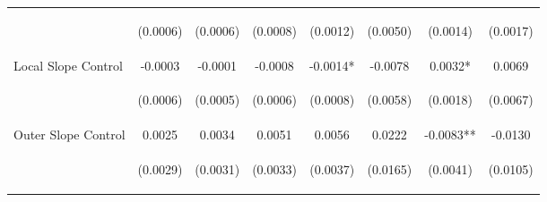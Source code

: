 \begin{tabular}{lccccccc}
\vspace{4pt} & \begin{footnotesize}(0.0006)\end{footnotesize} & \begin{footnotesize}(0.0006)\end{footnotesize} & \begin{footnotesize}(0.0008)\end{footnotesize} & \begin{footnotesize}(0.0012)\end{footnotesize} & \begin{footnotesize}(0.0050)\end{footnotesize} & \begin{footnotesize}(0.0014)\end{footnotesize} & \begin{footnotesize}(0.0017)\end{footnotesize} \\
Local Slope Control & -0.0003 & -0.0001 & -0.0008 & -0.0014* & -0.0078 & 0.0032* & 0.0069 \\
\vspace{4pt} & \begin{footnotesize}(0.0006)\end{footnotesize} & \begin{footnotesize}(0.0005)\end{footnotesize} & \begin{footnotesize}(0.0006)\end{footnotesize} & \begin{footnotesize}(0.0008)\end{footnotesize} & \begin{footnotesize}(0.0058)\end{footnotesize} & \begin{footnotesize}(0.0018)\end{footnotesize} & \begin{footnotesize}(0.0067)\end{footnotesize} \\
Outer Slope Control & 0.0025 & 0.0034 & 0.0051 & 0.0056 & 0.0222 & -0.0083** & -0.0130 \\
 & \begin{footnotesize}(0.0029)\end{footnotesize} & \begin{footnotesize}(0.0031)\end{footnotesize} & \begin{footnotesize}(0.0033)\end{footnotesize} & \begin{footnotesize}(0.0037)\end{footnotesize} & \begin{footnotesize}(0.0165)\end{footnotesize} & \begin{footnotesize}(0.0041)\end{footnotesize} & \begin{footnotesize}(0.0105)\end{footnotesize} \\

\end{tabular}
